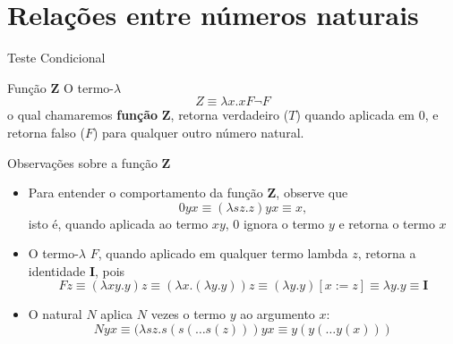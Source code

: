 \section{Relações entre números naturais}

\begin{frame}[fragile]{Teste Condicional}

    \begin{block}{Função $\mathbf{Z}$}
        O termo-$\lambda$
        \[
            Z\equiv \lambda x.xF\lnot F
        \]
        o qual chamaremos \textbf{função} $\mathbf{Z}$, retorna verdadeiro ($T$) quando aplicada
        em $0$, e retorna falso ($F$) para qualquer outro número natural.
    \end{block}

\end{frame}

\begin{frame}[fragile]{Observações sobre a função $\mathbf{Z}$}

    \begin{itemize}
        \item Para entender o comportamento da função $\mathbf{Z}$, observe que
        \[
            0yx \equiv (\lambda sz.z)yx \equiv x,
        \]
        isto é, quando aplicada ao termo $xy$, $0$ ignora o termo $y$ e retorna o termo
        $x$

        \item O termo-$\lambda$ $F$, quando aplicado em qualquer termo lambda $z$, 
        retorna a identidade $\mathbf{I}$, pois
        \[
            Fz \equiv (\lambda xy.y)z \equiv (\lambda x.(\lambda y.y))z \equiv (\lambda y.y)[x:=z]
                \equiv \lambda y.y \equiv \mathbf{I}
        \]

        \item O natural $N$ aplica $N$ vezes o termo $y$ ao argumento $x$:
        \[
            Nyx \equiv (\lambda sz.s(s(\ldots s(z)))yx \equiv y(y(\ldots y(x)))
        \]
    \end{itemize}

\end{frame}

